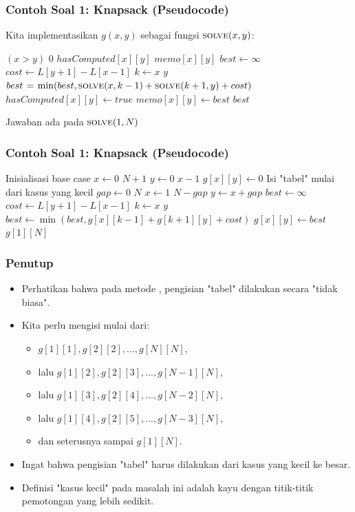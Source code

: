 \begin{frame}
\frametitle{Contoh Soal 1: Knapsack (Pseudocode)}
Kita implementasikan $g(x, y)$ sebagai fungsi $\textnormal{\scshape solve}(x,y)$:
\begin{small}
\begin{codebox}
\li \If $(x > y)$ \Then
\li   \Return $0$
\li \ElseIf $hasComputed[x][y]$ \Then
\li   \Return $memo[x][y]$ 
\li \Else
\li   $best \gets \infty$
\li   $cost \gets L[y+1] - L[x-1]$
\li   \For $k \gets x$ \To $y$ \Do
\li     $best \mathrel{\hspace{1pt}=\hspace{1pt}} \min(best, \textnormal{\scshape solve}(x,k-1) + \textnormal{\scshape solve}(k+1, y) + cost)$
      \End  
\li   $hasComputed[x][y] \gets true$
\li   $memo[x][y] \gets best$
\li   \Return $best$
    \End
\end{codebox}
\end{small}
Jawaban ada pada $\textnormal{\scshape solve}(1, N)$
\end{frame}

\begin{frame}
\frametitle{Contoh Soal 1: Knapsack (Pseudocode)}
\begin{small}
\begin{codebox}
\li \Comment Inisialisasi base case
\li \For $x \gets 0$ \To $N+1$ \Do
\li   \For $y \gets 0$ \To $x-1$ \Do
\li     $g[x][y] \gets 0$
      \End
    \End
\zi
\li \Comment Isi "tabel" mulai dari kasus yang kecil
\li \For $gap \gets 0$ \To $N$ \Do
\li   \For $x \gets 1$ \To $N-gap$ \Do
\li     $y \gets x + gap$
\li     $best \gets \infty$
\li     $cost \gets L[y+1] - L[x-1]$
\li     \For $k \gets x$ \To $y$ \Do
\li       $best \gets \min(best, g[x][k-1] + g[k+1][y] + cost)$
        \End  
\li     $g[x][y] \gets best$
      \End
    \End
\zi
\li \Return $g[1][N]$
\end{codebox}
\end{small}
\end{frame}

\begin{frame}
\frametitle{Penutup}
\begin{itemize}
  \item Perhatikan bahwa pada metode \fbottomup, pengisian "tabel" dilakukan secara "tidak biasa".
  \item Kita perlu mengisi mulai dari:
  \begin{itemize}
    \item $g[1][1], g[2][2], ..., g[N][N]$,
    \item lalu $g[1][2], g[2][3], ..., g[N-1][N]$,
    \item lalu $g[1][3], g[2][4], ..., g[N-2][N]$,
    \item lalu $g[1][4], g[2][5], ..., g[N-3][N]$,    
    \item dan seterusnya sampai $g[1][N]$.
  \end{itemize}
  \item Ingat bahwa pengisian "tabel" harus dilakukan dari kasus yang kecil ke besar.
  \item Definisi "kasus kecil" pada masalah ini adalah kayu dengan titik-titik pemotongan yang lebih sedikit.
\end{itemize}
\end{frame}

